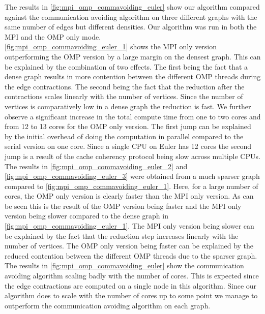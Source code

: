 The results in \autoref{fig:mpi_omp_commavoiding_euler} show our algorithm compared against the communication avoiding algorithm on three different graphs with the same number of edges but different densities. Our algorithm was run in both the MPI and the OMP only mode.\\
\autoref{fig:mpi_omp_commavoiding_euler_1} shows the MPI only version outperforming the OMP version by a large margin on the densest graph. This can be explained by the combination of two effects. The first being the fact that a dense graph results in more contention between the different OMP threads during the edge contractions. The second being the fact that the reduction after the contractions scales linearly with the number of vertices. Since the number of vertices is comparatively low in a dense graph the reduction is fast. We further observe a significant increase in the total compute time from one to two cores and from 12 to 13 cores for the OMP only version. The first jump can be explained by the initial overhead of doing the computation in parallel compared to the serial version on one core. Since a single CPU on Euler has 12 cores the second jump is a result of the cache coherency protocol being slow across multiple CPUs.\\
The results in \autoref{fig:mpi_omp_commavoiding_euler_2} and \autoref{fig:mpi_omp_commavoiding_euler_3} were obtained from a much sparser graph compared to \autoref{fig:mpi_omp_commavoiding_euler_1}. Here, for a large number of cores, the OMP only version is clearly faster than the MPI only version. As can be seen this is the result of the OMP version being faster and the MPI only version being slower compared to the dense graph in \autoref{fig:mpi_omp_commavoiding_euler_1}. The MPI only version being slower can be explained by the fact that the reduction step increases linearly with the number of vertices. The OMP only version being faster can be explained by the reduced contention between the different OMP threads due to the sparser graph.\\
The results in \autoref{fig:mpi_omp_commavoiding_euler} show the communication avoiding algorithm scaling badly with the number of cores. This is expected since the edge contractions are computed on a single node in this algorithm. Since our algorithm does to scale with the number of cores up to some point we manage to outperform the communication avoiding algorithm on each graph.

